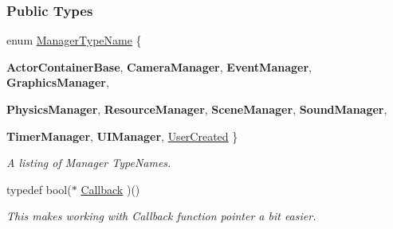\subsubsection*{Public Types}
\begin{DoxyCompactItemize}
\item 
enum \hyperlink{classphys_1_1ManagerBase_aaa6ccddf23892eaccb898529414f80a5}{ManagerTypeName} \{ \par
{\bfseries ActorContainerBase}, 
{\bfseries CameraManager}, 
{\bfseries EventManager}, 
{\bfseries GraphicsManager}, 
\par
{\bfseries PhysicsManager}, 
{\bfseries ResourceManager}, 
{\bfseries SceneManager}, 
{\bfseries SoundManager}, 
\par
{\bfseries TimerManager}, 
{\bfseries UIManager}, 
\hyperlink{classphys_1_1ManagerBase_aaa6ccddf23892eaccb898529414f80a5a3239296e554feede76c4bcb6f824c66c}{UserCreated}
 \}
\begin{DoxyCompactList}\small\item\em A listing of Manager TypeNames. \item\end{DoxyCompactList}\item 
\hypertarget{classphys_1_1ManagerBase_a753f5f0127131529767beab2502f480b}{
typedef bool($\ast$ \hyperlink{classphys_1_1ManagerBase_a753f5f0127131529767beab2502f480b}{Callback} )()}
\label{d2/de3/classphys_1_1ManagerBase_a753f5f0127131529767beab2502f480b}

\begin{DoxyCompactList}\small\item\em This makes working with Callback function pointer a bit easier. \item\end{DoxyCompactList}\end{DoxyCompactItemize}
